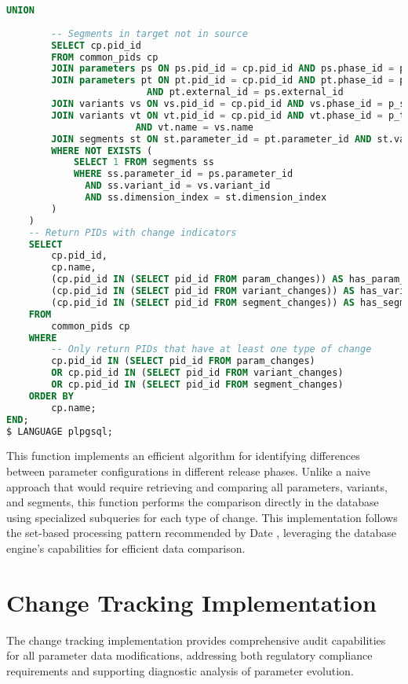 \begin{lstlisting}[language=SQL, caption={Phase Comparison Function}, label={lst:phase-comparison}]
        UNION
        
        -- Segments in target not in source
        SELECT cp.pid_id
        FROM common_pids cp
        JOIN parameters ps ON ps.pid_id = cp.pid_id AND ps.phase_id = p_source_phase_id
        JOIN parameters pt ON pt.pid_id = cp.pid_id AND pt.phase_id = p_target_phase_id
                         AND pt.external_id = ps.external_id
        JOIN variants vs ON vs.pid_id = cp.pid_id AND vs.phase_id = p_source_phase_id
        JOIN variants vt ON vt.pid_id = cp.pid_id AND vt.phase_id = p_target_phase_id
                       AND vt.name = vs.name
        JOIN segments st ON st.parameter_id = pt.parameter_id AND st.variant_id = vt.variant_id
        WHERE NOT EXISTS (
            SELECT 1 FROM segments ss
            WHERE ss.parameter_id = ps.parameter_id
              AND ss.variant_id = vs.variant_id
              AND ss.dimension_index = st.dimension_index
        )
    )
    -- Return PIDs with change indicators
    SELECT 
        cp.pid_id,
        cp.name,
        (cp.pid_id IN (SELECT pid_id FROM param_changes)) AS has_param_changes,
        (cp.pid_id IN (SELECT pid_id FROM variant_changes)) AS has_variant_changes,
        (cp.pid_id IN (SELECT pid_id FROM segment_changes)) AS has_segment_changes
    FROM 
        common_pids cp
    WHERE
        -- Only return PIDs that have at least one type of change
        cp.pid_id IN (SELECT pid_id FROM param_changes)
        OR cp.pid_id IN (SELECT pid_id FROM variant_changes)
        OR cp.pid_id IN (SELECT pid_id FROM segment_changes)
    ORDER BY 
        cp.name;
END;
$ LANGUAGE plpgsql;
\end{lstlisting}

This function implements an efficient algorithm for identifying differences between parameter configurations in different release phases. Unlike a naive approach that would require retrieving and comparing all parameters, variants, and segments, this function performs the comparison directly in the database using specialized subqueries for each type of change. This implementation follows the set-based processing pattern recommended by Date \cite{date2011sql}, leveraging the database engine's capabilities for efficient data comparison.

\section{Change Tracking Implementation}
\label{sec:change-tracking-implementation}

The change tracking implementation provides comprehensive audit capabilities for all parameter data modifications, addressing both regulatory compliance requirements and supporting diagnostic analysis of parameter evolution.

